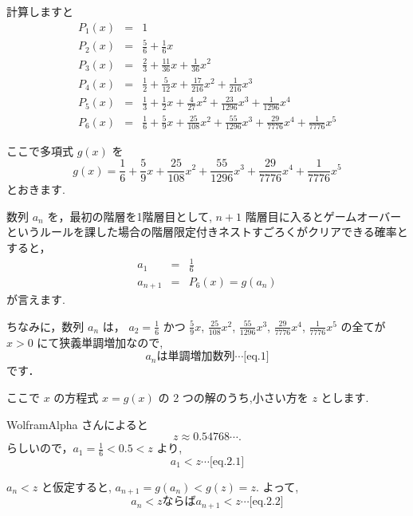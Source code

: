 \documentclass[a4j, 12pt]{jsarticle}
\begin{document}
計算しますと
\begin{eqnarray}
  P_1(x)&=& 1\\
  P_2(x)&=& \frac{5}{6} +\frac{ 1}{ 6}x\\
  P_3(x)&=& \frac{2}{3} +\frac{11}{36}x + \frac{ 1}{ 36}x^2\\
  P_4(x)&=& \frac{1}{2} +\frac{ 5}{12}x + \frac{17}{216}x^2 + \frac{ 1}{ 216} x^3\\
  P_5(x)&=& \frac{1}{3} +\frac{ 1}{ 2}x + \frac{ 4}{ 27}x^2 + \frac{23}{1296} x^3 + \frac{ 1}{1296} x^4\\
  P_6(x)&=& \frac{1}{6} +\frac{ 5}{ 9}x + \frac{25}{108}x^2 + \frac{55}{1296} x^3 + \frac{29}{7776} x^4 + \frac{1}{7776} x^5
\end{eqnarray}

ここで多項式 $g(x)$ を
\begin{equation}
  g(x) = \frac{1}{6} + \frac{5}{9} x+ \frac{25}{108} x^2 + \frac{55}{1296} x^3 + \frac{29}{7776} x^4 + \frac{1}{7776} x^5
\end{equation}
とおきます.

数列 $a_n$ を，最初の階層を1階層目として, $n+1$ 階層目に入るとゲームオーバーというルールを課した場合の階層限定付きネストすごろくがクリアできる確率とすると，
\begin{eqnarray}
  a_1 &=& \frac{1}{6}\\
  a_{n+1} &=& P_6(x) = g(a_n)
\end{eqnarray}
が言えます.

ちなみに，数列 $a_n$ は，
$a_2 = \frac{1}{6}$ かつ $\frac{5}{9}x$, $\frac{25}{108}x^2$, $\frac{55}{1296}x^3$, $\frac{29}{7776}x^4$, $\frac{1}{7776}x^5$ の全てが $x>0$ にて狭義単調増加なので,
\begin{equation*}
  a_n \textrm{は単調増加数列} \cdots \textrm{[eq.1]}
\end{equation*}
です．

ここで $x$ の方程式 $x = g(x)$ の 2 つの解のうち,小さい方を $z$ とします.

WolframAlpha さん\cite{wolframalpha}によると 
\begin{equation}
  z \approx 0.54768\cdots.
\end{equation}
らしいので，$a_1 = \frac{1}{6} < 0.5 < z$ より,
\begin{equation*}
  a_1 < z \cdots \textrm{[eq.2.1]}
\end{equation*}

$a_n < z$ と仮定すると, $a_{n+1} = g(a_n) < g(z) = z$. よって,
\begin{equation*}
  a_n < z \textrm{ならば} a_{n+1} < z \cdots \textrm{[eq.2.2]}
\end{equation*}
\end{document}
